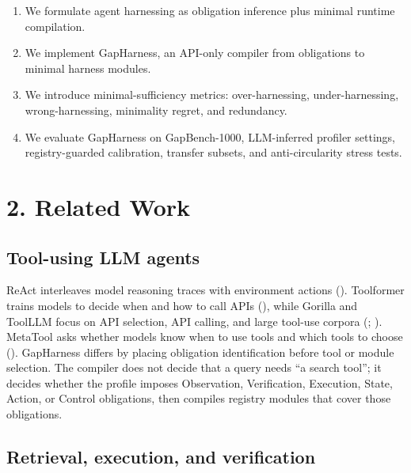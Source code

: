\documentclass[
  10pt,
]{article}
\providecommand{\tightlist}{%
  \setlength{\itemsep}{0pt}\setlength{\parskip}{0pt}}
\begin{document}
\begin{enumerate}
\def\labelenumi{\arabic{enumi}.}
\tightlist
\item
  We formulate agent harnessing as obligation inference plus minimal
  runtime compilation.
\item
  We implement GapHarness, an API-only compiler from obligations to
  minimal harness modules.
\item
  We introduce minimal-sufficiency metrics: over-harnessing,
  under-harnessing, wrong-harnessing, minimality regret, and redundancy.
\item
  We evaluate GapHarness on GapBench-1000, LLM-inferred profiler
  settings, registry-guarded calibration, transfer subsets, and
  anti-circularity stress tests.
\end{enumerate}

\section{2. Related Work}\label{related-work}

\subsection{Tool-using LLM agents}\label{tool-using-llm-agents}

ReAct interleaves model reasoning traces with environment actions
(). Toolformer trains
models to decide when and how to call APIs
(), while Gorilla
and ToolLLM focus on API selection, API calling, and large tool-use
corpora (;
). MetaTool asks whether
models know when to use tools and which tools to choose
(). GapHarness
differs by placing obligation identification before tool or module
selection. The compiler does not decide that a query needs ``a search
tool''; it decides whether the profile imposes Observation,
Verification, Execution, State, Action, or Control obligations, then
compiles registry modules that cover those obligations.

\subsection{Retrieval, execution, and
verification}\label{retrieval-execution-and-verification}
\end{document}

